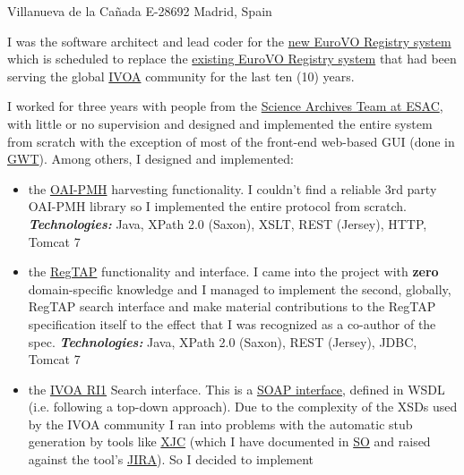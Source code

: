 \documentclass[helvetica,english,logo,notitle,totpages,utf8]{europecv2013}
\newcommand{\technologies}[0]{\textbf{\textit{Technologies:}}}
\begin{document}
\begin{europecv}
                   {Villanueva de la Cañada
                     E-28692 Madrid, Spain}
                                     {
I was the software architect and lead coder for the
    \href{registry.euro-vo.org}{new EuroVO Registry system}
    which is scheduled to replace the \href{registry.euro-vo.org}{existing EuroVO Registry system} that had been
    serving the global \href{http://www.ivoa.net/}{IVOA} community for the last ten (10) years.

  I worked for three years with people from the \href{http://www.sciops.esa.int/index.php?project=SAT}{Science
    Archives Team at ESAC}, with little or no supervision
  and designed and implemented the entire system from scratch with the exception of most
  of the front-end web-based GUI (done in \href{http://www.gwtproject.org/}{GWT}).
  Among others, I designed and implemented:
  \begin{itemize}
  \item the \href{http://www.openarchives.org/pmh/}{OAI-PMH} harvesting functionality. I couldn't find a reliable 3rd party OAI-PMH library
    so I implemented the entire protocol from scratch.
    \technologies{} Java, XPath 2.0 (Saxon), XSLT, REST (Jersey), HTTP, Tomcat 7
  \item the \href{http://www.ivoa.net/documents/RegTAP/}{RegTAP} functionality and interface. I came into the project with \textbf{zero} domain-specific
    knowledge and I managed to implement the second, globally, RegTAP search interface and make material
    contributions to the RegTAP specification itself to the effect that I was recognized as a co-author of the spec.
    \technologies{} Java, XPath 2.0 (Saxon), REST (Jersey), JDBC, Tomcat 7
  \item the \href{http://www.ivoa.net/documents/RegistryInterface/20091104/REC-RegistryInterface-1.0.pdf}{IVOA RI1} Search interface. This is a \href{https://en.wikipedia.org/wiki/SOAP}{SOAP interface}, defined in WSDL (i.e. following a top-down approach). 
    Due to the complexity of the XSDs used by the IVOA community I ran into problems with the automatic stub
    generation by tools like \href{https://docs.oracle.com/javase/6/docs/technotes/tools/share/xjc.html}{XJC} (which I have documented in \href{http://stackoverflow.com/q/17265960/274677}{SO} and raised
    against the tool's \href{https://java.net/jira/browse/JAXB-965}{JIRA}). So I decided to implement

\end{itemize}}
\end{europecv}
\end{document}
